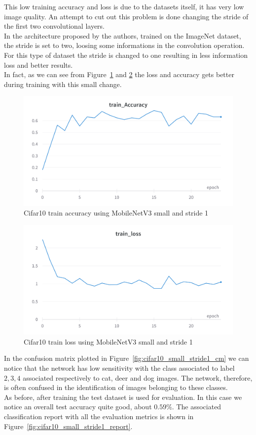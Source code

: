 \documentclass[12pt, letterpaper, twoside]{article}
\begin{document}
This low training accuracy and loss is due to the datasets itself, it has very low image quality. An attempt to cut out this problem is done changing the stride of the first two convolutional layers. \\
In the architecture proposed by the authors, trained on the ImageNet dataset, the stride is set to two, loosing some informations in the convolution operation. For this type of dataset the stride is changed to one resulting in less information loss and better results. \\
In fact, as we can see from Figure~\ref{fig:cifar10_small_stride1_acc} and \ref{fig:cifar10_small_stride1_loss} the loss and accuracy gets better during training with this small change.

\begin{figure}[H]
	\centering
	\includegraphics[width=.7\textwidth]{mnet_small_cifar10_accuracy.png}
	\caption{Cifar10 train accuracy using MobileNetV3 small and stride 1}
	\label{fig:cifar10_small_stride1_acc}
\end{figure}

\begin{figure}[H]
	\centering
	\includegraphics[width=.6\textwidth]{mnet_small_cifar10_loss.png}
	\caption{Cifar10 train loss using MobileNetV3 small and stride 1}
	\label{fig:cifar10_small_stride1_loss}
\end{figure}

In the confusion matrix plotted in Figure~\ref{fig:cifar10_small_stride1_cm} we can notice that the network has low sensitivity with the class associated to label $2,3,4$ associated respectively to cat, deer and dog images. The network, therefore, is often confused in the identification of images belonging to these classes.\\
As before, after training the test dataset is used for evaluation. In this case we notice an overall test accuracy quite good, about $0.59\%$. The associated classification report with all the evaluation metrics is shown in Figure~\ref{fig:cifar10_small_stride1_report}.
\end{document}

